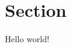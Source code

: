 \documentclass[12pt]{article}
\begin{document}
\maketitle

\section{Section}
Hello world!
\end{document}
